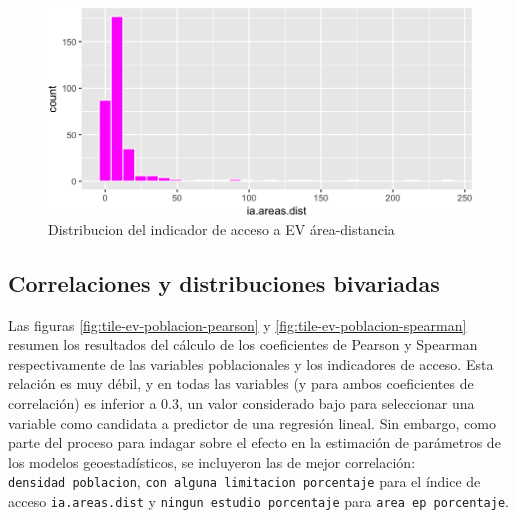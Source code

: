 \documentclass[12pt,a4paper,openany]{book}
\theoremstyle{definition}
\theoremstyle{definition}
\theoremstyle{definition}
\theoremstyle{remark}
\begin{document}
\begin{figure}

{\centering \includegraphics[width=1\linewidth]{tesis-unigis_files/figure-latex/hist-areasdist-1} 

}

\caption{Distribucion del indicador de acceso a EV área-distancia }\label{fig:hist-areasdist}
\end{figure}

\subsection{Correlaciones y distribuciones
bivariadas}\label{correlaciones-y-distribuciones-bivariadas}

Las figuras \ref{fig:tile-ev-poblacion-pearson} y
\ref{fig:tile-ev-poblacion-spearman} resumen los resultados del cálculo
de los coeficientes de Pearson y Spearman respectivamente de las
variables poblacionales y los indicadores de acceso. Esta relación es
muy débil, y en todas las variables (y para ambos coeficientes de
correlación) es inferior a 0.3, un valor considerado bajo para
seleccionar una variable como candidata a predictor de una regresión
lineal. Sin embargo, como parte del proceso para indagar sobre el efecto
en la estimación de parámetros de los modelos geoestadísticos, se
incluyeron las de mejor correlación: \texttt{densidad\ poblacion},
\texttt{con\ alguna\ limitacion\ porcentaje} para el índice de acceso
\texttt{ia.areas.dist} y \texttt{ningun\ estudio\ porcentaje} para
\texttt{area\ ep\ porcentaje}.
\end{document}
